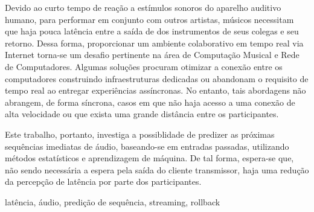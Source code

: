 \resumo
{}

Devido ao curto tempo de reação a estímulos sonoros do aparelho auditivo humano, para performar em conjunto com outros artistas, músicos necessitam que haja pouca latência entre a saída de dos instrumentos de seus colegas e seu retorno. Dessa forma, proporcionar um ambiente colaborativo em tempo real via Internet torna-se um desafio pertinente na área de Computação Musical e Rede de Computadores. Algumas soluções procuram otimizar a conexão entre os computadores construindo infraestruturas dedicadas ou abandonam o requisito de tempo real ao entregar experiências assíncronas. No entanto, tais abordagens não abrangem, de forma síncrona, casos em que não haja acesso a uma conexão de alta velocidade ou que exista uma grande distância entre os participantes.

Este trabalho, portanto, investiga a possiblidade de predizer as próximas sequências imediatas de áudio, baseando-se em entradas passadas, utilizando métodos estatísticos e aprendizagem de máquina. De tal forma, espera-se que, não sendo necessária a espera pela saída do cliente transmissor, haja uma redução da percepção de latência por parte dos participantes.
\begin{keywords}
latência, áudio, predição de sequência, streaming, rollback
\end{keywords}
